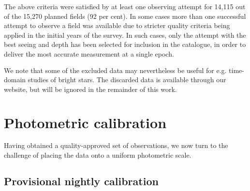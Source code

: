 \documentclass[a4paper,useAMS,usenatbib]{mn2e}
\begin{document}
The above criteria were satisfied by at least one observing attempt
for 14,115 out of the 15,270 planned fields (92 per cent).
In some cases more than one successful attempt to observe
a field was available due to stricter
quality criteria being applied in the initial years of the survey.
In such cases, only the attempt 
with the best seeing and depth has been selected
for inclusion in the catalogue, in order  
to deliver the most accurate measurement at a single epoch.

We note that some of the excluded data may nevertheless be useful
for e.g. time-domain studies of bright stars.
The discarded data is
available through our website,
but will be ignored in the remainder of this work.

\section{Photometric calibration}
\label{sec:calibration}

Having obtained a quality-approved set of observations,
we now turn to the challenge of placing the data
onto a uniform photometric scale.

\subsection{Provisional nightly calibration}
\end{document}
